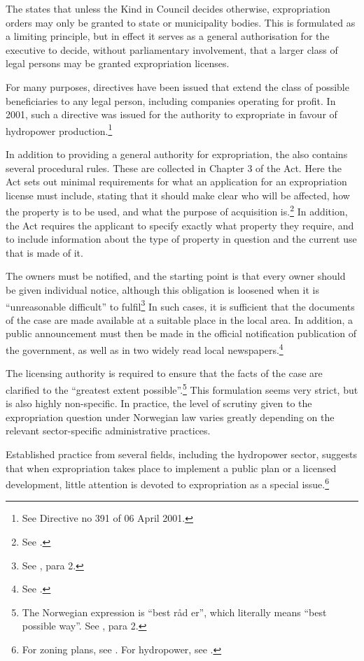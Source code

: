 The \cite{ea59} states that unless the Kind in Council decides otherwise, expropriation orders may only be granted to state or municipality bodies. This is formulated as a limiting principle, but in effect it serves as a general authorisation for the executive to decide, without parliamentary involvement, that a larger class of legal persons may be granted expropriation licenses. 

For many purposes, directives have been issued that extend the class of possible beneficiaries to any legal person, including companies operating for profit. In 2001, such a directive was issued for the authority to expropriate in favour of hydropower production.\footnote{See Directive no 391 of 06 April 2001.} 

In addition to providing a general authority for expropriation, the \cite{ea59} also contains several procedural rules. These are collected in Chapter 3 of the Act. Here the Act sets out minimal requirements for what an application for an expropriation license must include, stating that it should make clear who will be affected, how the property is to be used, and what the purpose of acquisition is.\footnote{See \cite[11]{ea59}.} In addition, the Act requires the applicant to specify exactly what property they require, and to include information about the type of property in question and the current use that is made of it.

The owners must be notified, and the starting point is that every owner should be given individual notice, although this obligation is loosened when it is ``unreasonable difficult'' to fulfil\footnote{See \cite[12]{ea59}, para 2.} In such cases, it is sufficient that the documents of the case are made available at a suitable place in the local area. In addition, a public announcement must then  be made in the official notification publication of the government, as well as in two widely read local newspapers.\footnote{See \cite[12]{ea59}.}

The licensing authority is required to ensure that the facts of the case are clarified to the ``greatest extent possible''.\footnote{The Norwegian expression is ``best råd er'', which literally means ``best possible way''. See \cite[12]{ea59}, para 2.} This formulation seems very strict, but is also highly non-specific. In practice, the level of scrutiny given to the expropriation question under Norwegian law varies greatly depending on the relevant sector-specific administrative practices.  

Established practice from several fields, including the hydropower sector, suggests that when expropriation takes place to implement a public plan or a licensed development, little attention is devoted to expropriation as a special issue.\footnote{For zoning plans, see \cite{namsos98,bo99}. For hydropower, see \cite{jorpeland11}.}

